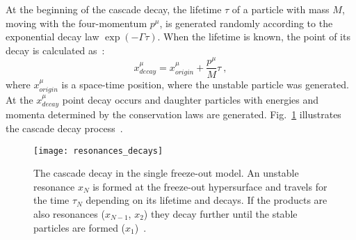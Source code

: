       At the beginning of the cascade decay, the lifetime $\tau$ of a particle with mass $M$, moving with the four-momentum $p^\mu$, is generated randomly according to the exponential decay law $\exp(-\Gamma\tau)$.
      When the lifetime is known, the point of its decay is calculated as~\cite{therminator}:
      \begin{equation}
        x^\mu_{decay} = x^\mu_{origin} + \frac{p^\mu}{M}\tau~,
      \end{equation}
      where $x^\mu_{origin}$ is a space-time position, where the unstable particle was generated.
      At the $x^\mu_{decay}$ point decay occurs and daughter particles with energies and momenta determined by the conservation laws are generated.
      Fig.~\ref{fig:resonances-decay} illustrates the cascade decay process~\cite{therminator}.
      \begin{figure}[h]
        \centering
        \texttt{[image: resonances\_decays]}
        \caption{The cascade decay in the single freeze-out model. An unstable resonance $x_N$ is formed at the freeze-out hypersurface and travels for the time $\tau_N$ depending on its lifetime and decays. If the products are also resonances ($x_{N-1}$, $x_2$) they decay further until the stable particles are formed ($x_1$)~\cite{therminator}.}
        \label{fig:resonances-decay}
      \end{figure}